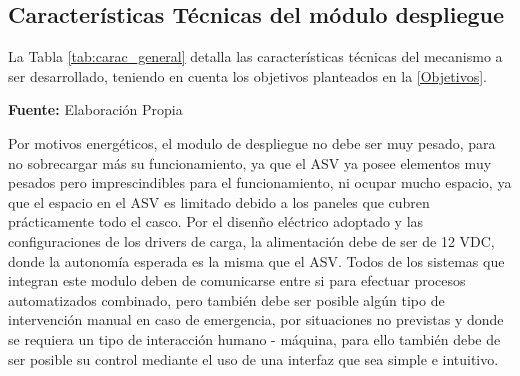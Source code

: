 \subsection[Caracter\'isticas T\'ecnicas del m\'odulo despliegue]{Caracter\'isticas T\'ecnicas del m\'odulo despliegue}
La Tabla \ref{tab:carac_general} detalla las caracter\'isticas t\'ecnicas del mecanismo a ser desarrollado, teniendo en cuenta los objetivos planteados en la  \autoref{Objetivos}.
\begin{table}[H]
\protect\caption[Datos T\'ecnicos]{Datos T\'ecnicos. \label{tab:carac_general}}
    \centering
    \vspace{5mm}
    \newline
    \hfill \textbf{Fuente:} Elaboraci\'on Propia
\end{table}
Por motivos energ\'eticos, el modulo de despliegue no debe ser muy pesado, para no sobrecargar m\'as su funcionamiento, ya que el ASV ya posee elementos muy pesados pero imprescindibles para el funcionamiento, ni ocupar mucho espacio, ya que el espacio en el ASV es limitado debido a los paneles que cubren pr\'acticamente todo el casco. 
Por el disen\~no el\'ectrico adoptado y las configuraciones de los drivers de carga, la alimentación debe de ser de 12 VDC, donde la autonom\'ia esperada es la misma que el ASV. Todos de los sistemas que integran este modulo deben de comunicarse entre si para efectuar procesos automatizados combinado, pero tambi\'en debe ser posible alg\'un tipo de intervenci\'on manual en caso de emergencia, por situaciones no previstas y donde se requiera un tipo de interacci\'on humano - máquina, para ello también debe de ser posible su control mediante el uso de una interfaz que sea simple e intuitivo.

